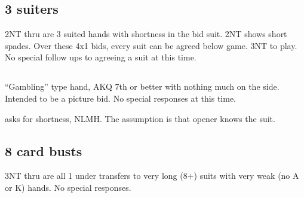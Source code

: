 \documentclass[tom-jenni]{subfile}
\begin{document}

	\subsection{3 suiters}
	
	2NT thru  are 3 suited hands with shortness in the bid suit. 2NT shows short spades. Over these 4x1 bids, every suit can be agreed below game. 3NT to play.  No special follow ups to agreeing a suit at this time.
	
	
	\subsection[3S]{}
	
	``Gambling'' type hand, AKQ 7th or better with nothing much on the side. Intended to be a picture bid. No special responses at this time. 

	 asks for shortness, NLMH.  The assumption is that opener knows the suit. 
	
	\subsection{8 card busts}
	
	3NT thru  are all 1 under transfers to very long (8+) suits with very weak (no A or K) hands. No special responses.
\end{document}
